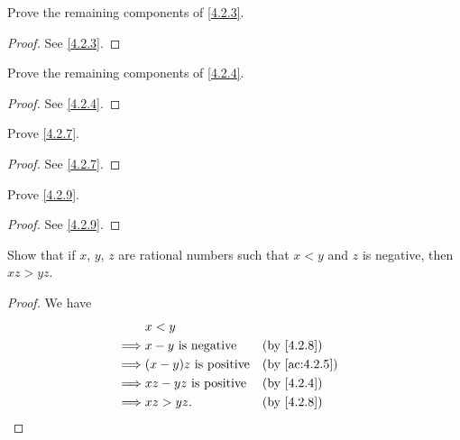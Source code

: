 \begin{ex}\label{ex:4.2.2}
  Prove the remaining components of \cref{4.2.3}.
\end{ex}

\begin{proof}
  See \cref{4.2.3}.
\end{proof}

\begin{ex}\label{ex:4.2.3}
  Prove the remaining components of \cref{4.2.4}.
\end{ex}

\begin{proof}
  See \cref{4.2.4}.
\end{proof}

\begin{ex}\label{ex:4.2.4}
  Prove \cref{4.2.7}.
\end{ex}

\begin{proof}
  See \cref{4.2.7}.
\end{proof}

\begin{ex}\label{ex:4.2.5}
  Prove \cref{4.2.9}.
\end{ex}

\begin{proof}
  See \cref{4.2.9}.
\end{proof}

\begin{ex}\label{ex:4.2.6}
  Show that if \(x\), \(y\), \(z\) are rational numbers such that \(x < y\) and \(z\) is negative, then \(xz > yz\).
\end{ex}

\begin{proof}
  We have
  \begin{align*}
             & x < y                                                         \\
    \implies & x - y \text{ is negative}    &  & \text{(by \cref{4.2.8})}    \\
    \implies & (x - y)z \text{ is positive} &  & \text{(by \cref{ac:4.2.5})} \\
    \implies & xz - yz \text{ is positive}  &  & \text{(by \cref{4.2.4})}    \\
    \implies & xz > yz.                     &  & \text{(by \cref{4.2.8})}
  \end{align*}
\end{proof}